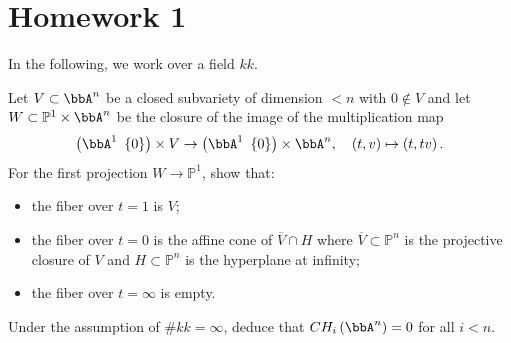 \section{Homework 1}


In the following, we work over a field $kk$.

\begin{exercise}
    Let $V \subset \bbA^n$ be a closed subvariety of dimension $< n$ with $0 \notin V$ and let $W \subset \mathbb{P}^1 \times \bbA^n$ be the closure of the image of the multiplication map 
    \[
    \left(\bbA^1 \ \left\{0\right\}\right) \times V \to \left(\bbA^1 \ \left\{0\right\}\right) \times \bbA^n , \quad \left(t , v\right) \mapsto \left(t , t v\right).
    \] 
    For the first projection $W \to \mathbb{P}^1$, show that: 
    \begin{itemize}
        \item the fiber over $t = 1$ is $V$; 
        \item the fiber over $t = 0$ is the affine cone of $\overline{V} \cap H$ where $\overline{V} \subset \mathbb{P}^n$ is the projective closure of $V$ and $H \subset \mathbb{P}^n$ is the hyperplane at infinity;
        \item the fiber over $t =\infty$ is empty.
    \end{itemize}
    Under the assumption of $\# kk = \infty$, deduce that $CH_i \left(\bbA^n\right) = 0$ for all $i < n$. 
\end{exercise}

